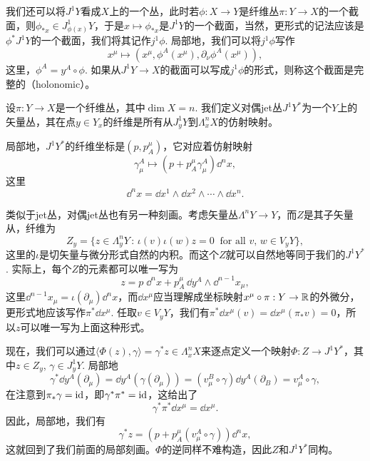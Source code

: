 我们还可以将$J^1Y$看成$X$上的一个丛，此时若$\phi:X\to Y$是纤维丛$\pi:Y\to X$的一个截面，则$\phi_{*x}\in J^1_{\phi(x)}Y$，于是$x\mapsto \phi_{*x}$是$J^1Y$的一个截面，当然，更形式的记法应该是$\phi^*J^1Y$的一个截面，我们将其记作$j^1\phi$. 局部地，我们可以将$j^1\phi$写作
\[
    x^\mu \mapsto \left (x^\mu,\phi^A(x^\mu),\partial_\nu \phi^A(x^\mu)\right ),
\]
这里，$\phi^A=y^A\circ \phi$. 如果从$J^1Y\to X$的截面可以写成$j^1\phi$的形式，则称这个截面是完整的（holonomic）。



\begin{para}[对偶jet丛]
    设$\pi:Y\to X$是一个纤维丛，其中$\dim X=n$. 我们定义对偶jet丛$J^1Y^*$为一个$Y$上的矢量丛，其在点$y\in Y_x$的纤维是所有从$J^1_yY$到$\Lambda^n_x X$的仿射映射。
\end{para}

局部地，$J^1Y^*$的纤维坐标是$(p,p_A^\mu)$，它对应着仿射映射
\[
    \gamma^A_\mu\mapsto \left (p+p_A^\mu \gamma^A_\mu \right )\dd^n x,
\]
这里
\[
    \dd^n x=\dd x^1\wedge \dd x^2\wedge \cdots \wedge \dd x^n.
\]

类似于jet丛，对偶jet丛也有另一种刻画。考虑矢量丛$\Lambda^n Y\to Y$，而$Z$是其子矢量从，纤维为
\[
    Z_y=\{z\in \Lambda^n_y Y\,:\,\iota(v)\iota(w)z=0\;\;\text{for all $v$, $w\in V_yY$}\},
\]
这里的$\iota$是切矢量与微分形式自然的内积。而这个$Z$就可以自然地等同于我们的$J^1Y^*$. 实际上，每个$Z$的元素都可以唯一写为
\[
    z=p\;\dd^n x+p_A^\mu \,\dd y^A\wedge \dd^{n-1}x_\mu,
\]
这里$\dd^{n-1}x_\mu=\iota(\partial_\mu)\dd^n x$，而$\dd x^\mu$应当理解成坐标映射$x^\mu\circ \pi:Y\to \mathbb{R}$的外微分，更形式地应该写作$\pi^*\dd x^\mu$. 任取$v\in V_y Y$，我们有$\pi^* \dd x^\mu(v)=\dd x^\mu (\pi_* v)=0$，所以$z$可以唯一写为上面这种形式。

现在，我们可以通过$\langle \Phi(z),\gamma\rangle =\gamma^*z\in \Lambda^{n}_x X$来逐点定义一个映射$\Phi:Z\to J^1Y^*$，其中$z\in Z_y$, $\gamma\in J^1_y Y$. 局部地
\[
    \gamma^*\dd y^A(\partial_\mu)=\dd y^A(\gamma (\partial_\mu))=
    (v^B_\mu\circ \gamma) \dd y^A(\partial_B)=v^A_\mu\circ \gamma,
\]
在注意到$\pi_*\gamma=\operatorname{id}$，即$\gamma^*\pi^*=\operatorname{id}$，这给出了
\[
    \gamma^*\pi^*\dd x^\mu=\dd x^\mu.
\]
因此，局部地，我们有
\[
    \gamma^*z = \left(p+p_A^\mu (v^A_\mu\circ \gamma)\right)\dd^n x,
\]
这就回到了我们前面的局部刻画。$\Phi$的逆同样不难构造，因此$Z$和$J^1Y^*$同构。

